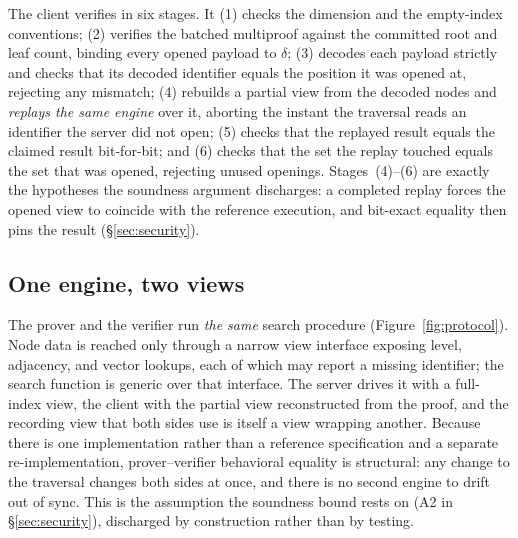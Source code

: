 \documentclass[11pt]{article}
\begin{document}
The client verifies in six stages. It (1) checks the dimension and the
empty-index conventions; (2) verifies the batched multiproof against the
committed root and leaf count, binding every opened payload to $\delta$;
(3) decodes each payload strictly and checks that its decoded identifier
equals the position it was opened at, rejecting any mismatch; (4)
rebuilds a partial view from the decoded nodes and \emph{replays the
same engine} over it, aborting the instant the traversal reads an
identifier the server did not open; (5) checks that the replayed result
equals the claimed result bit-for-bit; and (6) checks that the set the
replay touched equals the set that was opened, rejecting unused
openings. Stages~(4)--(6) are exactly the hypotheses the soundness
argument discharges: a completed replay forces the opened view to
coincide with the reference execution, and bit-exact equality then pins
the result (\S\ref{sec:security}).

\subsection{One engine, two views}

The prover and the verifier run \emph{the same} search procedure (Figure~\ref{fig:protocol}). Node
data is reached only through a narrow view interface exposing level,
adjacency, and vector lookups, each of which may report a missing
identifier; the search function is generic over that interface. The
server drives it with a full-index view, the client with the partial
view reconstructed from the proof, and the recording view that both
sides use is itself a view wrapping another. Because there is one
implementation rather than a reference specification and a separate
re-implementation, prover--verifier behavioral equality is structural:
any change to the traversal changes both sides at once, and there is no
second engine to drift out of sync. This is the assumption the soundness
bound rests on (A2 in \S\ref{sec:security}), discharged by construction
rather than by testing.
\end{document}

